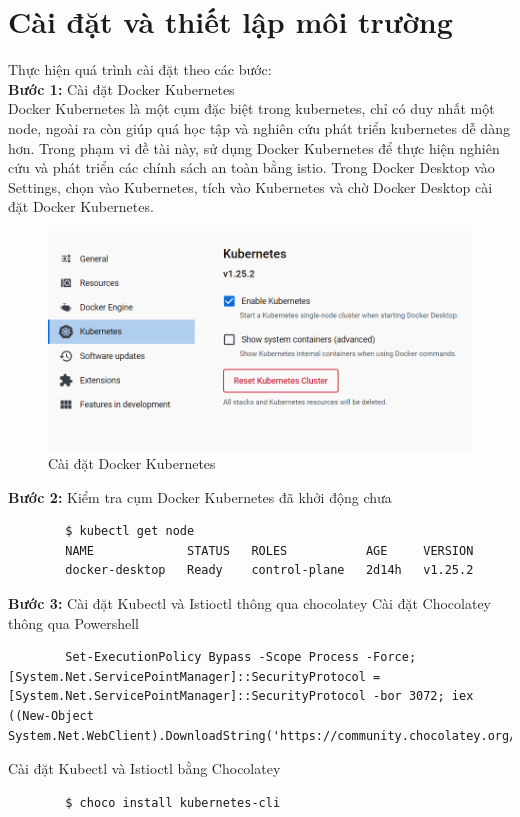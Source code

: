 \documentclass[14pt,a4paper]{book}
\begin{document}
{{	\section{Cài đặt và thiết lập môi trường}
	Thực hiện quá trình cài đặt theo các bước:\\
	\textbf{Bước 1:} Cài đặt Docker Kubernetes\\
	Docker Kubernetes là một cụm đặc biệt trong kubernetes, chỉ có duy nhất một node, ngoài ra còn giúp quá học tập và nghiên cứu phát triển kubernetes dễ dàng hơn. Trong phạm vi đề tài này, sử dụng Docker Kubernetes để thực hiện nghiên cứu và phát triển các chính sách an toàn bằng istio. Trong Docker Desktop vào Settings, chọn vào Kubernetes, tích vào Kubernetes và chờ Docker Desktop  cài đặt Docker Kubernetes.
	
	\begin{figure}[h!]
		\centering
		\includegraphics[width=0.65\linewidth]{Pics/3.2-1}
		\caption{Cài đặt Docker Kubernetes}
		\label{fig:3.2-1}
	\end{figure}
	
	\textbf{Bước 2:} Kiểm tra cụm Docker Kubernetes đã khởi động chưa
	\begin{lstlisting}
		$ kubectl get node
		NAME             STATUS   ROLES           AGE     VERSION
		docker-desktop   Ready    control-plane   2d14h   v1.25.2
	\end{lstlisting}
	\textbf{Bước 3:} Cài đặt Kubectl và Istioctl thông qua chocolatey
	Cài đặt Chocolatey thông qua Powershell
	\begin{lstlisting}
		Set-ExecutionPolicy Bypass -Scope Process -Force; [System.Net.ServicePointManager]::SecurityProtocol = [System.Net.ServicePointManager]::SecurityProtocol -bor 3072; iex ((New-Object System.Net.WebClient).DownloadString('https://community.chocolatey.org/install.ps1'))
	\end{lstlisting}
	
	Cài đặt Kubectl và Istioctl bằng Chocolatey
	\begin{lstlisting}
		$ choco install kubernetes-cli
		

\end{lstlisting}}}
\end{document}
